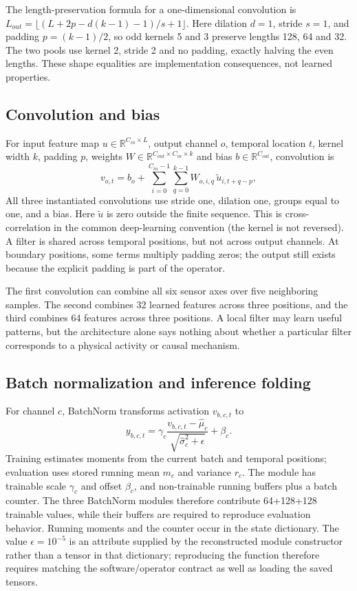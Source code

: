\documentclass[11pt,a4paper]{article}
\newcommand{\R}{\mathbb R}\newcommand{\relu}{\operatorname{ReLU}}
\begin{document}
The length-preservation formula for a one-dimensional convolution is $L_{out}=\lfloor(L+2p-d(k-1)-1)/s+1\rfloor$. Here dilation $d=1$, stride $s=1$, and padding $p=(k-1)/2$, so odd kernels 5 and 3 preserve lengths 128, 64 and 32. The two pools use kernel 2, stride 2 and no padding, exactly halving the even lengths. These shape equalities are implementation consequences, not learned properties.

\subsection{Convolution and bias}
For input feature map $u\in\R^{C_{in}\times L}$, output channel $o$, temporal location $t$, kernel width $k$, padding $p$, weights $W\in\R^{C_{out}\times C_{in}\times k}$ and bias $b\in\R^{C_{out}}$, convolution is
\[
 v_{o,t}=b_o+\sum_{i=0}^{C_{in}-1}\sum_{q=0}^{k-1}W_{o,i,q}\,\widetilde u_{i,t+q-p},
\]
All three instantiated convolutions use stride one, dilation one, groups equal to one, and a bias. Here $\widetilde u$ is zero outside the finite sequence. This is cross-correlation in the common deep-learning convention (the kernel is not reversed). A filter is shared across temporal positions, but not across output channels. At boundary positions, some terms multiply padding zeros; the output still exists because the explicit padding is part of the operator.

The first convolution can combine all six sensor axes over five neighboring samples. The second combines 32 learned features across three positions, and the third combines 64 features across three positions. A local filter may learn useful patterns, but the architecture alone says nothing about whether a particular filter corresponds to a physical activity or causal mechanism.

\subsection{Batch normalization and inference folding}
For channel $c$, BatchNorm transforms activation $v_{b,c,t}$ to
\[
 y_{b,c,t}=\gamma_c\frac{v_{b,c,t}-\widehat\mu_c}{\sqrt{\widehat\sigma_c^2+\epsilon}}+\beta_c.
\]
Training estimates moments from the current batch and temporal positions; evaluation uses stored running mean $m_c$ and variance $r_c$. The module has trainable scale $\gamma_c$ and offset $\beta_c$, and non-trainable running buffers plus a batch counter. The three BatchNorm modules therefore contribute 64+128+128 trainable values, while their buffers are required to reproduce evaluation behavior. Running moments and the counter occur in the state dictionary. The value $\epsilon=10^{-5}$ is an attribute supplied by the reconstructed module constructor rather than a tensor in that dictionary; reproducing the function therefore requires matching the software/operator contract as well as loading the saved tensors.
\end{document}
